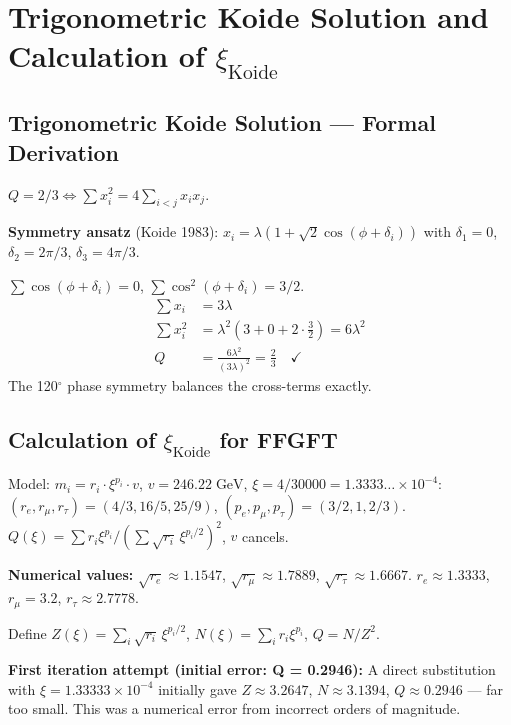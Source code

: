 \section{Trigonometric Koide Solution and Calculation of $\xi_{\text{Koide}}$}


\subsection{Trigonometric Koide Solution --- Formal Derivation}

$Q=2/3 \Leftrightarrow \sum x_i^2=4\sum_{i<j}x_ix_j$.

\textbf{Symmetry ansatz} (Koide 1983):
$x_i=\lambda(1+\sqrt{2}\cos(\phi+\delta_i))$
with $\delta_1=0$, $\delta_2=2\pi/3$, $\delta_3=4\pi/3$.

$\sum\cos(\phi+\delta_i)=0$, $\sum\cos^2(\phi+\delta_i)=3/2$.
\begin{align*}
  \sum x_i &= 3\lambda \\
  \sum x_i^2 &= \lambda^2(3+0+2\cdot\tfrac{3}{2}) = 6\lambda^2 \\
  Q &= \frac{6\lambda^2}{(3\lambda)^2} = \frac{2}{3} \quad\checkmark
\end{align*}
The 120$^\circ$ phase symmetry balances the cross-terms exactly.

\subsection{Calculation of $\xi_{\text{Koide}}$ for FFGFT}

Model: $m_i=r_i\cdot\xi^{p_i}\cdot v$, $v=246.22\;\text{GeV}$,
$\xi=4/30000=1.3333\ldots\times10^{-4}$:
$(r_e,r_\mu,r_\tau)=(4/3,16/5,25/9)$, $(p_e,p_\mu,p_\tau)=(3/2,1,2/3)$.
$Q(\xi)=\sum r_i\xi^{p_i}/(\sum\sqrt{r_i}\,\xi^{p_i/2})^2$, $v$ cancels.

\textbf{Numerical values:}
$\sqrt{r_e}\approx1.1547$, $\sqrt{r_\mu}\approx1.7889$, $\sqrt{r_\tau}\approx1.6667$.
$r_e\approx1.3333$, $r_\mu=3.2$, $r_\tau\approx2.7778$.

Define $Z(\xi)=\sum_i\sqrt{r_i}\,\xi^{p_i/2}$,
$N(\xi)=\sum_ir_i\xi^{p_i}$, $Q=N/Z^2$.

\textbf{First iteration attempt (initial error: Q = 0.2946):}
A direct substitution with $\xi=1.33333\times10^{-4}$ initially gave $Z\approx3.2647$,
$N\approx3.1394$, $Q\approx0.2946$ --- far too small. This was a numerical error
from incorrect orders of magnitude.


